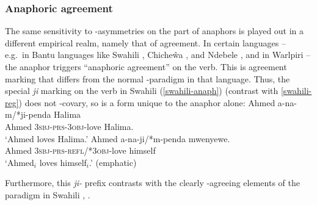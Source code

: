 \documentclass[output=paper, modfonts, nonflat]{langsci/langscibook}
\begin{document}
\subsubsection{Anaphoric agreement}

The same sensitivity to \person-asymmetries on the part of anaphors is
played out in a different empirical realm, namely that of
agreement. In certain languages -- e.g.\ in Bantu languages like
Swahili \citep{woolford:1999}, Chicheŵa \citep{baker:2008}, and
Ndebele \citep{bowlot:2002}, and in Warlpiri \citep{legate:2002} --
the anaphor triggers ``anaphoric agreement'' on the verb.  This is
agreement marking that differs from the normal \ph-paradigm in that
language. Thus, the special \textit{ji} marking on the verb in Swahili
(\ref{swahili-anaph}) (contrast with \ref{swahili-reg}) does not
\ph-covary, so is a form unique to the anaphor alone:
\ea\label{swahili-reg}\gll Ahmed a-na-m/*ji-penda
Halima\\
Ahmed {\scshape 3sbj-prs-3obj}-love Halima.\\
\glt `Ahmed loves Halima.'  \ex\label{swahili-anaph}\gll Ahmed
a-na-ji/*m-penda
mwenyewe.\\
Ahmed {\scshape 3sbj-prs-refl/*3obj}-love himself\\
\glt `Ahmed$_i$ loves himself$_i$.' (emphatic) \z

\noindent Furthermore, this \textit{ji-} prefix contrasts with the clearly
\ph-agreeing elements of the paradigm in Swahili \citep[245]
{thompsonschleicher:2001}, .
\end{document}
